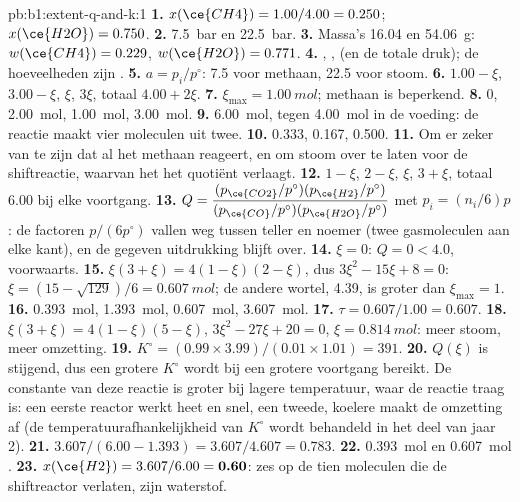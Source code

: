 \begin{solution}{pb:b1:extent-q-and-k:1}
\textbf{1.} $x(\ce{CH4}) = 1.00/4.00 = 0.250$; $x(\ce{H2O}) = 0.750$.
\textbf{2.} \qty{7.5}{bar} en \qty{22.5}{bar}.
\textbf{3.} Massa's 16.04 en \qty{54.06}{g}: $w(\ce{CH4}) = 0.229$,
$w(\ce{H2O}) = 0.771$.
\textbf{4.} , ,  (en de totale
druk); de hoeveelheden zijn .
\textbf{5.} $a = p_i/p^\circ$: 7.5 voor methaan, 22.5 voor stoom.
\textbf{6.}  $1.00 - \xi$,  $3.00 - \xi$,  $\xi$,
 $3\xi$, totaal $4.00 + 2\xi$.
\textbf{7.} $\xi_{\max} = \qty{1.00}{mol}$; methaan is beperkend.
\textbf{8.}  0,  \qty{2.00}{mol},  \qty{1.00}{mol},
 \qty{3.00}{mol}.
\textbf{9.} \qty{6.00}{mol}, tegen \qty{4.00}{mol} in de voeding: de
reactie maakt vier moleculen uit twee.
\textbf{10.}  0.333,  0.167,  0.500.
\textbf{11.} Om er zeker van te zijn dat al het methaan reageert, en om
stoom over te laten voor de shiftreactie, waarvan het het quotiënt
verlaagt.
\textbf{12.}  $1 - \xi$,  $2 - \xi$,  $\xi$, 
$3 + \xi$, totaal 6.00 bij elke voortgang.
\textbf{13.} $Q = \dfrac{(p_{\ce{CO2}}/p^\circ)(p_{\ce{H2}}/p^\circ)}
{(p_{\ce{CO}}/p^\circ)(p_{\ce{H2O}}/p^\circ)}$ met $p_i = (n_i/6)p$: de
factoren $p/(6p^\circ)$ vallen weg tussen teller en noemer (twee
gasmoleculen aan elke kant), en de gegeven uitdrukking blijft over.
\textbf{14.} $\xi = 0$: $Q = 0 < 4.0$, voorwaarts.
\textbf{15.} $\xi(3 + \xi) = 4(1 - \xi)(2 - \xi)$, dus $3\xi^2 - 15\xi +
8 = 0$: $\xi = (15 - \sqrt{129})/6 = \qty{0.607}{mol}$; de andere wortel,
4.39, is groter dan $\xi_{\max} = 1$.
\textbf{16.}  \qty{0.393}{mol},  \qty{1.393}{mol},
 \qty{0.607}{mol},  \qty{3.607}{mol}.
\textbf{17.} $\tau = 0.607/1.00 = 0.607$.
\textbf{18.} $\xi(3 + \xi) = 4(1 - \xi)(5 - \xi)$, $3\xi^2 - 27\xi + 20 =
0$, $\xi = \qty{0.814}{mol}$: meer stoom, meer omzetting.
\textbf{19.} $K^\circ = (0.99 \times 3.99)/(0.01 \times 1.01) = 391$.
\textbf{20.} $Q(\xi)$ is stijgend, dus een grotere $K^\circ$ wordt bij
een grotere voortgang bereikt. De constante van deze reactie is groter
bij lagere temperatuur, waar de reactie traag is: een eerste reactor werkt
heet en snel, een tweede, koelere maakt de omzetting af (de
temperatuurafhankelijkheid van $K^\circ$ wordt behandeld in het deel van
jaar 2).
\textbf{21.} $3.607/(6.00 - 1.393) = 3.607/4.607 = 0.783$.
\textbf{22.} \qty{0.393}{mol}  en \qty{0.607}{mol} .
\textbf{23.} $x(\ce{H2}) = 3.607/6.00 = \textbf{0.60}$: zes op de tien
moleculen die de shiftreactor verlaten, zijn waterstof.
\end{solution}
